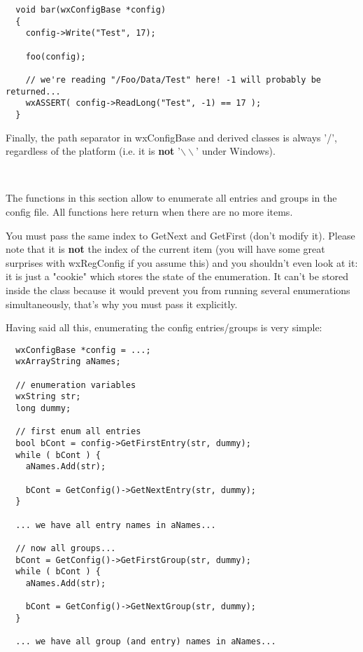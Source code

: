 \begin{verbatim}
  void bar(wxConfigBase *config)
  {
    config->Write("Test", 17);

    foo(config);

    // we're reading "/Foo/Data/Test" here! -1 will probably be returned...
    wxASSERT( config->ReadLong("Test", -1) == 17 );
  }
\end{verbatim}

Finally, the path separator in wxConfigBase and derived classes is always '/',
regardless of the platform (i.e. it is {\bf not} '$\backslash\backslash$' under Windows).

\\


\label{configenumeration}

The functions in this section allow to enumerate all entries and groups in the
config file. All functions here return \false when there are no more items.

You must pass the same index to GetNext and GetFirst (don't modify it).
Please note that it is {\bf not} the index of the current item (you will have
some great surprises with wxRegConfig if you assume this) and you shouldn't
even look at it: it is just a "cookie" which stores the state of the
enumeration. It can't be stored inside the class because it would prevent you
from running several enumerations simultaneously, that's why you must pass it
explicitly.

Having said all this, enumerating the config entries/groups is very simple:

\begin{verbatim}
  wxConfigBase *config = ...;
  wxArrayString aNames;

  // enumeration variables
  wxString str;
  long dummy;

  // first enum all entries
  bool bCont = config->GetFirstEntry(str, dummy);
  while ( bCont ) {
    aNames.Add(str);

    bCont = GetConfig()->GetNextEntry(str, dummy);
  }

  ... we have all entry names in aNames...

  // now all groups...
  bCont = GetConfig()->GetFirstGroup(str, dummy);
  while ( bCont ) {
    aNames.Add(str);

    bCont = GetConfig()->GetNextGroup(str, dummy);
  }

  ... we have all group (and entry) names in aNames...

\end{verbatim}

